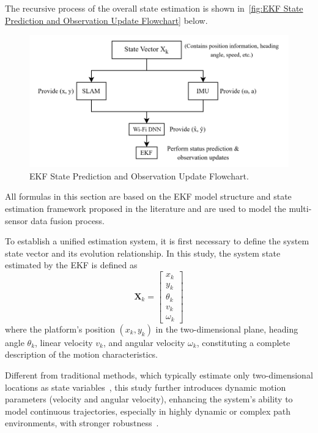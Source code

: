 \documentclass[12pt,a4paper]{article}
\numberwithin{equation}{section}
\begin{document}
The recursive process of the overall state estimation is shown
in~\autoref{fig:EKF State Prediction and Observation Update Flowchart} below.
\begin{figure}[H]
  \centering
  \includegraphics[width=0.85\linewidth]{images/图片1.png}
  \caption{EKF State Prediction and Observation Update Flowchart.}
  \label{fig:EKF State Prediction and Observation Update Flowchart}
\end{figure}

All formulas in this section are based on the EKF model structure and state
estimation framework proposed in the literature
\cite{bailey2006consistency,lerro1993tracking,li2013high} and are used to model
the multi-sensor data fusion process.

To establish a unified estimation system, it is first necessary to define the
system state vector and its evolution relationship. In this study, the system
state estimated by the EKF is defined as
\begin{equation}
  \mathbf{X}_k =
  \begin{bmatrix}
    x_k \\
    y_k \\
    \theta_k \\
    v_k \\
    \omega_k
  \end{bmatrix}
  \label{eq:Xk_definition}
\end{equation}
where the platform's position $(x_k, y_k)$ in the two-dimensional plane, heading
angle $\theta_k$, linear velocity $v_k$, and angular velocity $\omega_k$,
constituting a complete description of the motion characteristics.

Different from traditional methods, which typically estimate only
two-dimensional locations as state variables~\cite{li2006indoor}, this study
further introduces dynamic motion parameters (velocity and angular velocity),
enhancing the system's ability to model continuous trajectories, especially in
highly dynamic or complex path environments, with stronger
robustness~\cite{sun2019fusion}.
\end{document}
